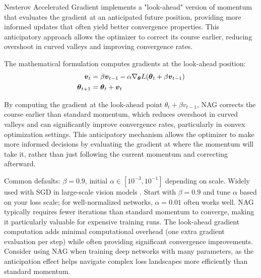 Nesterov Accelerated Gradient implements a "look-ahead" version of momentum that evaluates the gradient at an anticipated future position, providing more informed updates that often yield better convergence properties. This anticipatory approach allows the optimizer to correct its course earlier, reducing overshoot in curved valleys and improving convergence rates.

The mathematical formulation computes gradients at the look-ahead position:
\begin{align}
\boldsymbol{v}_t &= \beta \boldsymbol{v}_{t-1} - \alpha \nabla_{\boldsymbol{\theta}} L(\boldsymbol{\theta}_t + \beta \boldsymbol{v}_{t-1}) \\
\boldsymbol{\theta}_{t+1} &= \boldsymbol{\theta}_t + \boldsymbol{v}_t
\end{align}

By computing the gradient at the look-ahead point \(\theta_t+\beta v_{t-1}\), NAG corrects the course earlier than standard momentum, which reduces overshoot in curved valleys and can significantly improve convergence rates, particularly in convex optimization settings. This anticipatory mechanism allows the optimizer to make more informed decisions by evaluating the gradient at where the momentum will take it, rather than just following the current momentum and correcting afterward.\cite{Nesterov1983,WebOptimizationDLBook,GoodfellowEtAl2016}

\begin{remark}
Common defaults: \(\beta=0.9\), initial \(\alpha\in[10^{-3},10^{-1}]\) depending on scale. Widely used with SGD in large-scale vision models \cite{He2016}. Start with \(\beta=0.9\) and tune \(\alpha\) based on your loss scale; for well-normalized networks, \(\alpha=0.01\) often works well. NAG typically requires fewer iterations than standard momentum to converge, making it particularly valuable for expensive training runs. The look-ahead gradient computation adds minimal computational overhead (one extra gradient evaluation per step) while often providing significant convergence improvements. Consider using NAG when training deep networks with many parameters, as the anticipation effect helps navigate complex loss landscapes more efficiently than standard momentum.
\end{remark}

